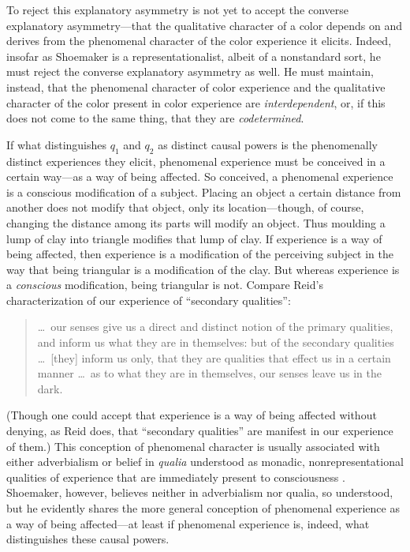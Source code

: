 \documentclass[12pt]{article}
\begin{document}
To reject this explanatory asymmetry is not yet to accept the converse explanatory asymmetry---that the qualitative character of a color depends on and derives from the phenomenal character of the color experience it elicits. Indeed, insofar as Shoemaker is a representationalist, albeit of a nonstandard sort, he must reject the converse explanatory asymmetry as well. He must maintain, instead, that the phenomenal character of color experience and the qualitative character of the color present in color experience are \emph{interdependent}, or, if this does not come to the same thing, that they are \emph{codetermined}.

If what distinguishes \( q_1 \) and \( q_2 \) as distinct causal powers is the phenomenally distinct experiences they elicit, phenomenal experience must be conceived in a certain way---as a way of being affected. So conceived, a phenomenal experience is a conscious modification of a subject. Placing an object a certain distance from another does not modify that object, only its location---though, of course, changing the distance among its parts will modify an object. Thus moulding a lump of clay into triangle modifies that lump of clay. If experience is a way of being affected, then experience is a modification of the perceiving subject in the way that being triangular is a modification of the clay. But whereas experience is a \emph{conscious} modification, being triangular is not. Compare Reid's characterization of our experience of ``secondary qualities'': 
\begin{quote}
    \ldots\ our senses give us a direct and distinct notion of the primary qualities, and inform us what they are in themselves: but of the secondary qualities \ldots\ [they] inform us only, that they are qualities that effect us in a certain manner \ldots\ as to what they are in themselves, our senses leave us in the dark. \citep[II, 17]{Reid:1969lr}
\end{quote}
(Though one could accept that experience is a way of being affected without denying, as Reid does, that ``secondary qualities'' are manifest in our experience of them.) This conception of phenomenal character is usually associated with either adverbialism \citep[see][]{Ducasse:1942oq,Chisholm:1957dq,Aune:1967mk,Sellars:1968lf,Tye:1984hc} or belief in \emph{qualia} understood as monadic, nonrepresentational qualities of experience that are immediately present to consciousness \citep[see][]{Block:1996qf,Jackson:1982my}. Shoemaker, however, believes neither in adverbialism nor qualia, so understood, but he evidently shares the more general conception of phenomenal experience as a way of being affected---at least if phenomenal experience is, indeed, what distinguishes these causal powers.
\end{document}
